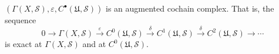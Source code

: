 $(\Gamma(X, \mathcal{S}), \varepsilon, C^{\bullet}(\mathfrak{U}, \mathcal{S}))$ is an augmented cochain complex. That is, the sequence
$$0 \rightarrow \Gamma(X, \mathcal{S}) \xrightarrow{\varepsilon} C^0(\mathfrak{U}, \mathcal{S}) \xrightarrow{\delta} C^1(\mathfrak{U}, \mathcal{S}) \xrightarrow{\delta} C^2(\mathfrak{U}, \mathcal{S}) \rightarrow \cdots$$
is exact at $\Gamma(X, \mathcal{S})$ and at $C^0(\mathfrak{U}, \mathcal{S})$.
